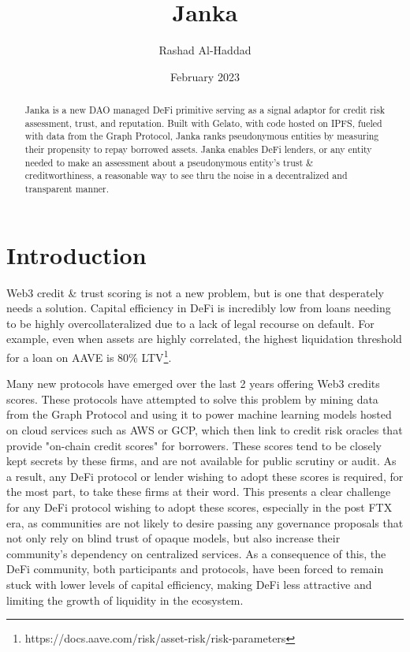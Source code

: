 \documentclass{article}
\title{Janka}
\author{Rashad Al-Haddad}
\date{February 2023}
\begin{document}
\maketitle

\begin{abstract}
   Janka is a new DAO managed DeFi primitive serving as a signal adaptor for credit risk assessment, trust, and reputation. Built with Gelato, with code hosted on IPFS, fueled with data from the Graph Protocol, Janka ranks pseudonymous entities by measuring their propensity to repay borrowed assets. Janka enables DeFi lenders, or any entity needed to make an assessment about a pseudonymous entity's trust \& creditworthiness, a reasonable way to see thru the noise in a decentralized and transparent manner.
\end{abstract}

\section{Introduction}
    Web3 credit \& trust scoring is not a new problem, but is one that desperately needs a solution. Capital efficiency in DeFi is incredibly low from loans needing to be highly overcollateralized due to a lack of legal recourse on default. For example, even when assets are highly correlated, the highest liquidation threshold for a loan on AAVE is 80$\%$ LTV\footnote{https://docs.aave.com/risk/asset-risk/risk-parameters}. 
    
    Many new protocols have emerged over the last 2 years offering Web3 credits scores. These protocols have attempted to solve this problem by mining data from the Graph Protocol and using it to power machine learning models hosted on cloud services such as AWS or GCP, which then link to credit risk oracles that provide "on-chain credit scores" for borrowers. These scores tend to be closely kept secrets by these firms, and are not available for public scrutiny or audit. As a result, any DeFi protocol or lender wishing to adopt these scores is required, for the most part, to take these firms at their word. This presents a clear challenge for any DeFi protocol wishing to adopt these scores, especially in the post FTX era, as communities are not likely to desire passing any governance proposals that not only rely on blind trust of opaque models, but also increase their community's dependency on centralized services. As a consequence of this, the DeFi community, both participants and protocols, have been forced to remain stuck with lower levels of capital efficiency, making DeFi less attractive and limiting the growth of liquidity in the ecosystem. 
\end{document}
